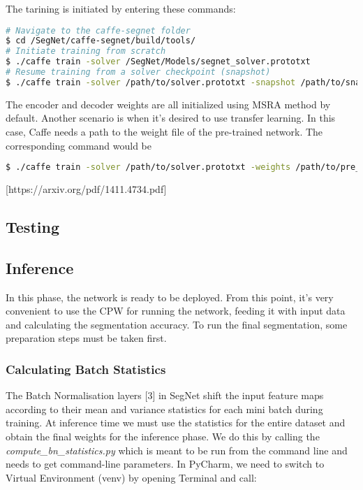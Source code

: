 \noindent The tarining is initiated by entering these commands:

\begin{lstlisting}[language=bash]
# Navigate to the caffe-segnet folder
$ cd /SegNet/caffe-segnet/build/tools/
# Initiate training from scratch
$ ./caffe train -solver /SegNet/Models/segnet_solver.prototxt
# Resume training from a solver checkpoint (snapshot)
$ ./caffe train -solver /path/to/solver.prototxt -snapshot /path/to/snapshot_iter_XY.solverstate
\end{lstlisting}

The encoder and decoder weights are all initialized using MSRA method by default. Another scenario is when it's desired to use transfer learning. In this case, Caffe needs a path to the weight file of the pre-trained network. The corresponding command would be

\begin{lstlisting}[language=bash]
$ ./caffe train -solver /path/to/solver.prototxt -weights /path/to/pre_trained_weights.caffemodel
\end{lstlisting}

 [https://arxiv.org/pdf/1411.4734.pdf]
 
\subsection{Testing}

\subsection{Inference}

In this phase, the network is ready to be deployed. From this point, it's very convenient to use the CPW for running the network, feeding it with input data and calculating the segmentation accuracy. To run the final segmentation, some preparation steps must be taken first.

\subsubsection{Calculating Batch Statistics}
The Batch Normalisation layers [3] in SegNet shift the input feature maps according to their mean and variance statistics for each mini batch during training. At inference time we must use the statistics for the entire dataset and obtain the final weights for the inference phase. We do this by calling the \textit{compute\_bn\_statistics.py} which is meant to be run from the command line and needs to get command-line parameters. In PyCharm, we need to switch to Virtual Environment (venv) by opening Terminal and call:

